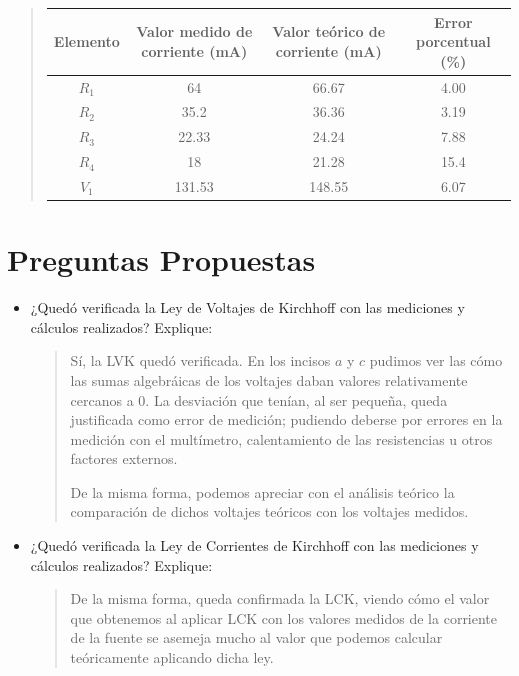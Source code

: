 \documentclass{article}
\begin{document}
\begin{enumerate}[label=\alph*.-]
\begin{quote}
            \begin{table}[ht]
                \centering
                \begin{tabular}{|c|c|c|c|} %
                    \midrule 
                    Elemento        & Valor medido de corriente (\unit{\milli\ampere})   & Valor teórico de corriente (\unit{\milli\ampere})  & Error porcentual (\%)\\
                    \midrule
                    $R_1$           & 64        & 66.67     & 4.00  \\
                    $R_2$           & 35.2      & 36.36     & 3.19  \\
                    $R_3$           & 22.33     & 24.24     & 7.88  \\
                    $R_4$           & 18        & 21.28     & 15.4  \\
                    $V_1$           & 131.53    & 148.55    & 6.07  \\
                    \midrule
                \end{tabular}
            \end{table}
            
        \end{quote}
    \end{enumerate}

    \section{Preguntas Propuestas}
    \begin{itemize}
        \item ¿Quedó verificada la Ley de Voltajes de Kirchhoff con las mediciones y cálculos realizados? Explique:
        
        \begin{quote}
            Sí, la LVK quedó verificada. En los incisos $a$ y $c$ pudimos ver las cómo las sumas algebráicas de los voltajes daban valores relativamente cercanos a $0$. La desviación que tenían, al ser pequeña, queda justificada como error de medición; pudiendo deberse por errores en la medición con el multímetro, calentamiento de las resistencias u otros factores externos.

            De la misma forma, podemos apreciar con el análisis teórico la comparación de dichos voltajes teóricos con los voltajes medidos.
        \end{quote}
        
        \item ¿Quedó verificada la Ley de Corrientes de Kirchhoff con las mediciones y cálculos realizados? Explique:
        
        \begin{quote}
            De la misma forma, queda confirmada la LCK, viendo cómo el valor que obtenemos al aplicar LCK con los valores medidos de la corriente de la fuente se asemeja mucho al valor que podemos calcular teóricamente aplicando dicha ley.
        \end{quote}
        
    \end{itemize}
\end{document}
